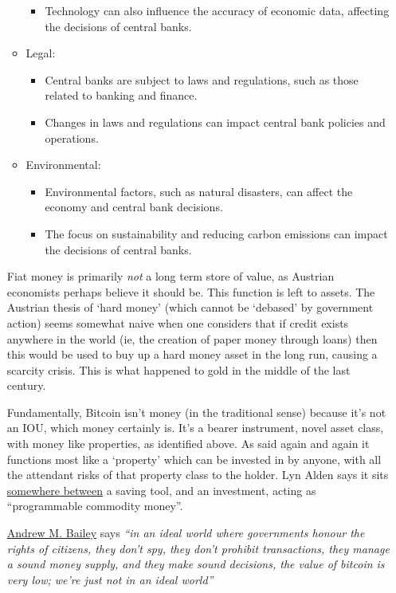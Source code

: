 \begin{itemize}
\begin{itemize}
\begin{itemize}
\item Technology can also influence the accuracy of economic data, affecting the decisions of central banks.
\end{itemize}
\item Legal:
\begin{itemize}
\item Central banks are subject to laws and regulations, such as those related to banking and finance.
\item Changes in laws and regulations can impact central bank policies and operations.
\end{itemize}
\item Environmental:
\begin{itemize}
\item Environmental factors, such as natural disasters, can affect the economy and central bank decisions.
\item The focus on sustainability and reducing carbon emissions can impact the decisions of central banks.
\end{itemize}
\end{itemize}
Fiat money is primarily \textit{not} a long term store of value, as Austrian economists perhaps believe it should be. This function is left to assets. The Austrian thesis of `hard money' (which cannot be `debased' by government action) seems somewhat naive when one considers that if credit exists anywhere in the world (ie, the creation of paper money through loans) then this would be used to buy up a hard money asset in the long run, causing a scarcity crisis. This is what happened to gold in the middle of the last century. \par 
Fundamentally, Bitcoin isn't money (in the traditional sense) because it's not an IOU, which money certainly is. It's a bearer instrument, novel asset class, with money like properties, as identified above. As said again and again it functions most like a `property' which can be invested in by anyone, with all the attendant risks of that property class to the holder. Lyn Alden says it sits \href{https://www.lynalden.com/what-is-money/}{somewhere between} a saving tool, and an investment, acting as ``programmable commodity money''.\par 
\href{https://andrewmbailey.com/}{Andrew M. Bailey} says \textit{``in an ideal world where governments honour the rights of citizens, they don't spy, they don't prohibit transactions, they manage a sound money supply, and they make sound decisions, the value of bitcoin is very low; we're just not in an ideal world''}\par

\end{itemize}
